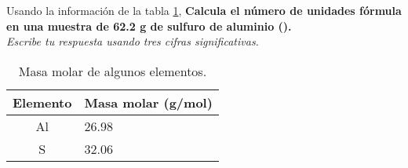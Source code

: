 Usando la información de la tabla \ref{tab:q004},
\textbf{Calcula el número de unidades fórmula en una muestra de 62.2 g de sulfuro de aluminio ().}\\
\emph{Escribe tu respuesta usando tres cifras significativas.}

\begin{multicols}{2}
    \begin{table}[H]
        \centering
        \caption{Masa molar de algunos elementos.}
        \label{tab:q004}
        \begin{tabular}{c|p{2.2cm}}
            \textbf{Elemento} & \textbf{Masa molar (g/mol)} \\\midrule
            Al                & 26.98                       \\\hline
            S                 & 32.06                       \\\hline
            \bottomrule
        \end{tabular}
    \end{table}

    \columnbreak

    \begin{solutionbox}{7cm}
    \end{solutionbox}
\end{multicols}